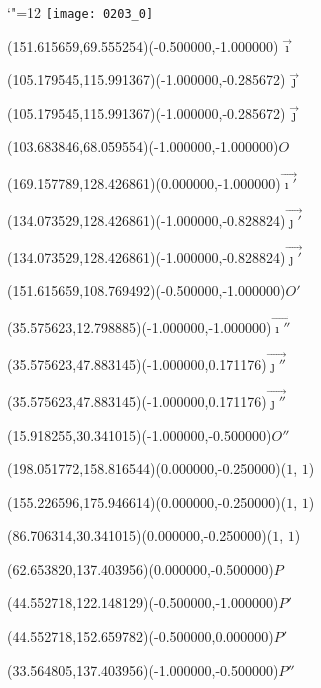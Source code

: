 \documentclass[12pt]{article}
\begin{document}
\makeatletter%
\let\ASYencoding\f@encoding%
\let\ASYfamily\f@family%
\let\ASYseries\f@series%
\let\ASYshape\f@shape%
\makeatother%
{\catcode`"=12%
\texttt{[image: 0203\_0]}%
}%
\kern -227.622047pt%
%
%
\fontsize{12.000000}{14.400000}\selectfont%
\usefont{\ASYencoding}{\ASYfamily}{\ASYseries}{\ASYshape}%
\ASYalign(151.615659,69.555254)(-0.500000,-1.000000){$\vec{\imath}$}%
%
%
\fontsize{12.000000}{14.400000}\selectfont%
\ASYalign(105.179545,115.991367)(-1.000000,-0.285672){$\vec{\jmath}$}%
%
%
\fontsize{12.000000}{14.400000}\selectfont%
\ASYalign(105.179545,115.991367)(-1.000000,-0.285672){$\vec{\jmath}$}%
%
%
\fontsize{12.000000}{14.400000}\selectfont%
\ASYalign(103.683846,68.059554)(-1.000000,-1.000000){$O$}%
%
%
\fontsize{12.000000}{14.400000}\selectfont%
\ASYalign(169.157789,128.426861)(0.000000,-1.000000){$\vec{\imath'}$}%
%
%
\fontsize{12.000000}{14.400000}\selectfont%
\ASYalign(134.073529,128.426861)(-1.000000,-0.828824){$\vec{\jmath'}$}%
%
%
\fontsize{12.000000}{14.400000}\selectfont%
\ASYalign(134.073529,128.426861)(-1.000000,-0.828824){$\vec{\jmath'}$}%
%
%
\fontsize{12.000000}{14.400000}\selectfont%
\ASYalign(151.615659,108.769492)(-0.500000,-1.000000){$O'$}%
%
%
\fontsize{12.000000}{14.400000}\selectfont%
\ASYalign(35.575623,12.798885)(-1.000000,-1.000000){$\vec{\imath''}$}%
%
%
\fontsize{12.000000}{14.400000}\selectfont%
\ASYalign(35.575623,47.883145)(-1.000000,0.171176){$\vec{\jmath''}$}%
%
%
\fontsize{12.000000}{14.400000}\selectfont%
\ASYalign(35.575623,47.883145)(-1.000000,0.171176){$\vec{\jmath''}$}%
%
%
\fontsize{12.000000}{14.400000}\selectfont%
\ASYalign(15.918255,30.341015)(-1.000000,-0.500000){$O''$}%
%
%
\fontsize{12.000000}{14.400000}\selectfont%
\ASYalign(198.051772,158.816544)(0.000000,-0.250000){($1$, $1$)}%
%
%
\fontsize{12.000000}{14.400000}\selectfont%
\ASYalign(155.226596,175.946614)(0.000000,-0.250000){($1$, $1$)}%
%
%
\fontsize{12.000000}{14.400000}\selectfont%
\ASYalign(86.706314,30.341015)(0.000000,-0.250000){($1$, $1$)}%
%
%
\fontsize{12.000000}{14.400000}\selectfont%
\ASYalign(62.653820,137.403956)(0.000000,-0.500000){$P$}%
%
%
\fontsize{12.000000}{14.400000}\selectfont%
\ASYalign(44.552718,122.148129)(-0.500000,-1.000000){$P'$}%
%
%
\fontsize{12.000000}{14.400000}\selectfont%
\ASYalign(44.552718,152.659782)(-0.500000,0.000000){$P'$}%
%
%
\fontsize{12.000000}{14.400000}\selectfont%
\ASYalign(33.564805,137.403956)(-1.000000,-0.500000){$P''$}%
\end{document}
